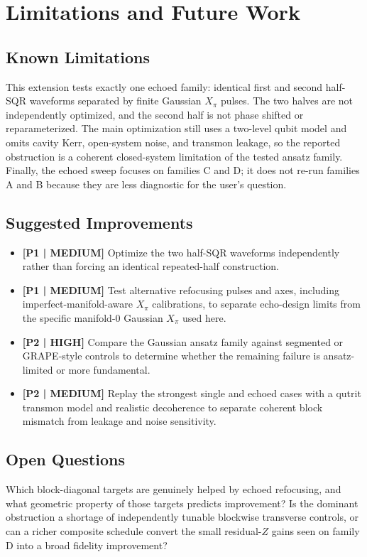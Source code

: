 \documentclass[aps,pra,twocolumn,reprint,floatfix,amsmath,amssymb]{revtex4-2}
\begin{document}
\section{Limitations and Future Work}

\subsection{Known Limitations}
This extension tests exactly one echoed family: identical first and second half-SQR waveforms separated by finite Gaussian \(X_\pi\) pulses. The two halves are not independently optimized, and the second half is not phase shifted or reparameterized. The main optimization still uses a two-level qubit model and omits cavity Kerr, open-system noise, and transmon leakage, so the reported obstruction is a coherent closed-system limitation of the tested ansatz family. Finally, the echoed sweep focuses on families C and D; it does not re-run families A and B because they are less diagnostic for the user's question.

\subsection{Suggested Improvements}
\begin{itemize}
  \item \textbf{[P1 | MEDIUM]} Optimize the two half-SQR waveforms independently rather than forcing an identical repeated-half construction.
  \item \textbf{[P1 | MEDIUM]} Test alternative refocusing pulses and axes, including imperfect-manifold-aware \(X_\pi\) calibrations, to separate echo-design limits from the specific manifold-0 Gaussian \(X_\pi\) used here.
  \item \textbf{[P2 | HIGH]} Compare the Gaussian ansatz family against segmented or GRAPE-style controls \cite{khaneja2005grape} to determine whether the remaining failure is ansatz-limited or more fundamental.
  \item \textbf{[P2 | MEDIUM]} Replay the strongest single and echoed cases with a qutrit transmon model and realistic decoherence to separate coherent block mismatch from leakage and noise sensitivity.
\end{itemize}

\subsection{Open Questions}
Which block-diagonal targets are genuinely helped by echoed refocusing, and what geometric property of those targets predicts improvement? Is the dominant obstruction a shortage of independently tunable blockwise transverse controls, or can a richer composite schedule convert the small residual-\(Z\) gains seen on family D into a broad fidelity improvement?
\end{document}
